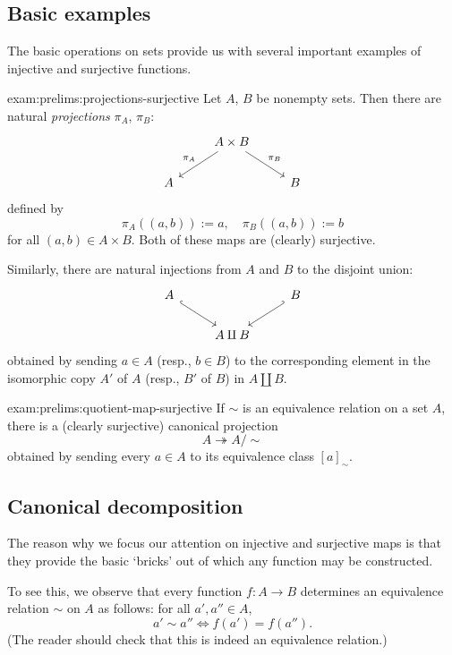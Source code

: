 \subsection{Basic examples}%
\label{subsec:prelims:basic-examples}
The basic operations on sets provide us with several important
examples of injective and surjective functions.

\begin{exam}{}{exam:prelims:projections-surjective}
  Let $A$, $B$ be nonempty sets. Then there are natural \emph{projections}
  $\pi_A$, $\pi_B$:
  \[
    \begin{tikzcd}
      & A \times B \arrow[dl, "\pi_A"'] \arrow[dr, "\pi_B"] & \\
      A & & B
    \end{tikzcd}
  \]
  defined by
  \[ \pi_A((a,b)) := a, \quad \pi_B((a,b)) := b \] for all
  $(a,b) \in A \times B$. Both of these maps are (clearly) surjective.
\end{exam}

\begin{exam}{}{}
  Similarly, there are natural injections from $A$ and $B$ to the
  disjoint union:
  \[
    \begin{tikzcd}
      A \arrow[dr, hook] & & B \arrow[dl, hook'] \\
      & A \amalg B &
    \end{tikzcd}
  \]
  obtained by sending $a \in A$ (resp., $b \in B$) to the
  corresponding element in the isomorphic copy $A'$ of $A$ (resp.,
  $B'$ of $B$) in $A \amalg B$.
\end{exam}

\begin{exam}{}{exam:prelims:quotient-map-surjective}
  If $\sim$ is an equivalence relation on a set $A$, there is a
  (clearly surjective) canonical projection
  \[ A \twoheadrightarrow A/{\sim} \] obtained by sending every
  $a \in A$ to its equivalence class ${[a]}_\sim$.
\end{exam}

\subsection{Canonical decomposition}%
\label{subsec:prelims:canonical-decomposition}
The reason why we focus our attention on injective and surjective maps
is that they provide the basic `bricks' out of which any function may
be constructed.

To see this, we observe that every function $f : A \to B$ determines
an equivalence relation $\sim$ on $A$ as follows: for all
$a', a'' \in A$,
\[ a' \sim a'' \iff f(a') = f(a''). \] (The reader should check that
this is indeed an equivalence relation.)

